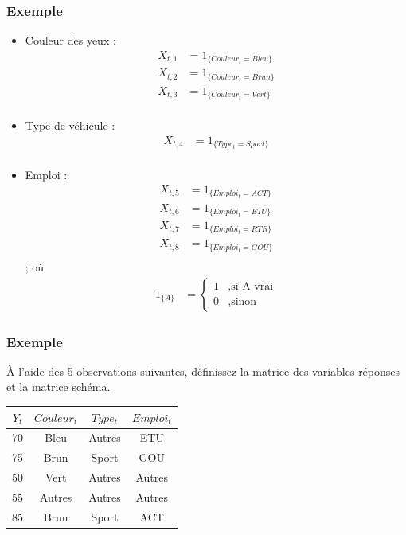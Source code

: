 \documentclass[11pt,french]{report}
\begin{document}
\subsubsection*{Exemple}
\begin{itemize}
\item Couleur des yeux : 
\begin{align*}
X_{t,1} &= 1_{\{Couleur_t = Bleu\}} \\
X_{t,2} &= 1_{\{Couleur_t = Brun\}} \\
X_{t,3} &= 1_{\{Couleur_t = Vert\}} \\
\end{align*}
\item Type de véhicule :
\begin{align*}
X_{t,4} &= 1_{\{Type_t = Sport\}} \\
\end{align*}
\item Emploi :
\begin{align*}
X_{t,5} &= 1_{\{Emploi_t = ACT\}} \\
X_{t,6} &= 1_{\{Emploi_t = ETU\}} \\
X_{t,7} &= 1_{\{Emploi_t = RTR\}} \\
X_{t,8} &= 1_{\{Emploi_t = GOU\}} \\
\end{align*}
; où 
\begin{align*}
1_{\{A\}} &= 
\left \lbrace
     \begin{array}{rl}
     1 &, \text{si A vrai} \\
     0 &, \text{sinon}
     \end{array}
     \right.
\end{align*}

\end{itemize}

\subsubsection*{Exemple}
À l'aide des 5 observations suivantes, définissez la matrice des variables réponses et la matrice schéma.

\bigskip
\begin{center}
\begin{tabular}{|c|c|c|c|}
\hline
$Y_t$ & $Couleur_t$ & $Type_t$ & $Emploi_t$ \\
\hline
70 & Bleu & Autres & ETU \\
75 & Brun & Sport & GOU \\
50 & Vert & Autres & Autres \\
55 & Autres & Autres & Autres \\
85 & Brun & Sport & ACT \\
\hline
\end{tabular}
\end{center}
\bigskip
\end{document}
